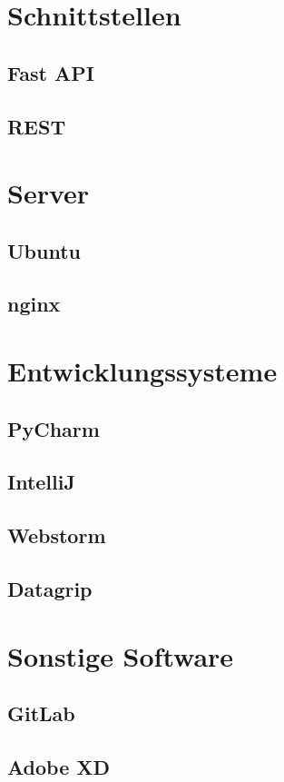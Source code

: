 \documentclass[pdftex,11pt,a4paper]{book}
\begin{document}
\section{Schnittstellen}
\subsection{Fast API}
\subsection{REST}

\section{Server}
\subsection{Ubuntu}
\subsection{nginx}

\section{Entwicklungssysteme}
\subsection{PyCharm}
\subsection{IntelliJ}
\subsection{Webstorm}
\subsection{Datagrip}
\section{Sonstige Software}
\subsection{GitLab}
\subsection{Adobe XD}
\end{document}
